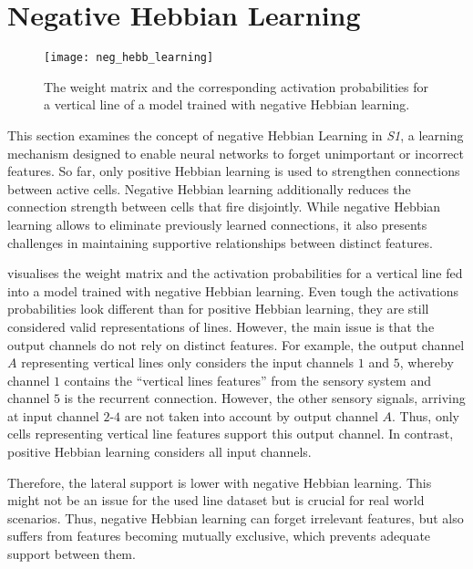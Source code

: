 \chapter{Negative Hebbian Learning}
%
\begin{figure}[h]
    \centering
    \texttt{[image: neg\_hebb\_learning]}
    \caption[Weight matrix and activations with negative Hebbian learning]{The weight matrix and the corresponding activation probabilities for a vertical line of a model trained with negative Hebbian learning.}
\end{figure}
%
This section examines the concept of negative Hebbian Learning in \emph{S1}, a learning mechanism designed to enable neural networks to forget unimportant or incorrect features. 
So far, only positive Hebbian learning is used to strengthen connections between active cells.
Negative Hebbian learning additionally reduces the connection strength between cells that fire disjointly.
While negative Hebbian learning allows to eliminate previously learned connections, it also presents challenges in maintaining supportive relationships between distinct features.

 visualises the weight matrix and the activation probabilities for a vertical line fed into a model trained with negative Hebbian learning.
Even tough the activations probabilities look different than for positive Hebbian learning, they are still considered valid representations of lines.
However, the main issue is that the output channels do not rely on distinct features.
For example, the output channel $A$ representing vertical lines only considers the input channels $1$ and $5$, whereby channel $1$ contains the ``vertical lines features'' from the sensory system and channel $5$ is the recurrent connection.
However, the other sensory signals, arriving at input channel $2$-$4$ are not taken into account by output channel $A$.
Thus, only cells representing vertical line features support this output channel.
In contrast, positive Hebbian learning considers all input channels.


Therefore, the lateral support is lower with negative Hebbian learning.
This might not be an issue for the used line dataset but is crucial for real world scenarios.
Thus, negative Hebbian learning can forget irrelevant features, but also suffers from features becoming mutually exclusive, which prevents adequate support between them.

